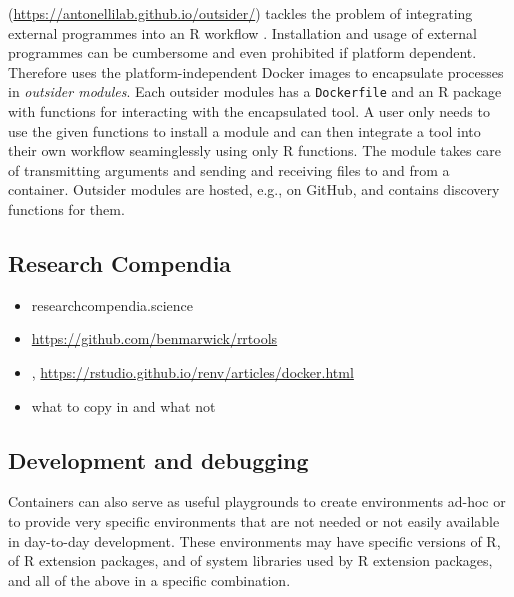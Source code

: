 \textbf{} (\url{https://antonellilab.github.io/outsider/})
tackles the problem of integrating external programmes into an R
workflow \citep{bennett_outsider_2019}. Installation and usage of
external programmes can be cumbersome and even prohibited if platform
dependent. Therefore  uses the platform-independent Docker
images to encapsulate processes in \emph{outsider modules}. Each
outsider modules has a \texttt{Dockerfile} and an R package with
functions for interacting with the encapsulated tool. A user only needs
to use the given functions to install a module and can then integrate a
tool into their own workflow seaminglessly using only R functions. The
module takes care of transmitting arguments and sending and receiving
files to and from a container. Outsider modules are hosted, e.g., on
GitHub, and  contains discovery functions for them.

\hypertarget{research-compendia}{%
\subsection{Research Compendia}\label{research-compendia}}

\label{compendia}

\begin{itemize}
\tightlist
\item
  researchcompendia.science
\item
  \url{https://github.com/benmarwick/rrtools}
\item
  , \url{https://rstudio.github.io/renv/articles/docker.html}
\item
  what to copy in and what not
\end{itemize}

\hypertarget{development-and-debugging}{%
\subsection{Development and debugging}\label{development-and-debugging}}

\label{development}

Containers can also serve as useful playgrounds to create environments
ad-hoc or to provide very specific environments that are not needed or
not easily available in day-to-day development. These environments may
have specific versions of R, of R extension packages, and of system
libraries used by R extension packages, and all of the above in a
specific combination.

